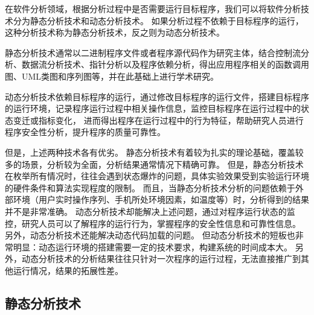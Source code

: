 在软件分析领域，根据分析过程中是否需要运行目标程序，我们可以将软件分析技术分为静态分析技术和动态分析技术。
如果分析过程不依赖于目标程序的运行，这种分析技术称为静态分析技术，反之则为动态分析技术。

静态分析技术通常以二进制程序文件或者程序源代码作为研究主体，结合控制流分析、数据流分析技术、指针分析以及程序依赖分析，得出应用程序相关的函数调用图、UML类图和序列图等，并在此基础上进行学术研究。

动态分析技术依赖目标程序的运行，通过修改目标程序的运行文件，搭建目标程序的运行环境，记录程序运行过程中相关操作信息，监控目标程序在运行过程中的状态变迁或指标变化，
进而得出程序在运行过程中的行为特征，帮助研究人员进行程序安全性分析，提升程序的质量可靠性。




但是，上述两种技术各有优劣。
静态分析技术有着较为扎实的理论基础，覆盖较多的场景，分析较为全面，分析结果通常情况下精确可靠。
但是，静态分析技术在枚举所有情况时，往往会遇到状态爆炸的问题，具体实验效果受到实验运行环境的硬件条件和算法实现程度的限制。
而且，当静态分析技术分析的问题依赖于外部环境（用户实时操作序列、手机所处环境因素，如温度等）时，分析得到的结果并不是非常准确。
动态分析技术却能解决上述问题，通过对程序运行状态的监控，研究人员可以了解程序的运行行为，掌握程序的安全性信息和可靠性信息。
另外，动态分析技术还能解决动态代码加载的问题。
但动态分析技术的短板也非常明显：动态运行环境的搭建需要一定的技术要求，构建系统的时间成本大。
另外，动态分析技术的分析结果往往只针对一次程序的运行过程，无法直接推广到其他运行情况，结果的拓展性差。




\subsection{静态分析技术}


